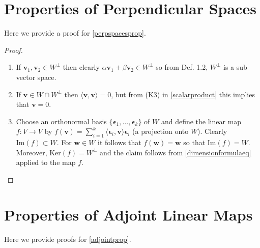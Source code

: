 \documentclass[a4paper,12pt]{report}
\begin{document}
\begin{appendices}
\section{Properties of Perpendicular Spaces} \label{perpspacespropapp} 

Here we provide a proof for \cref{perpspacesprop}.

\begin{proof}
    \begin{enumerate}[label=(\(L\)\arabic*)]
        \item If \(\mathbf{v}_1, \mathbf{v}_2 \in W^\perp\) then clearly \(\alpha \mathbf{v}_1 + \beta \mathbf{v}_2 \in W^\perp\) so from Def. 1.2, \(W^\perp\) is a sub vector space.
        \item If \(\mathbf{v} \in W \cap W^\perp\) then \(\langle \mathbf{v}, \mathbf{v} \rangle = 0\), but from (K3) in \cref{scalarproduct}  this implies that \(\mathbf{v} = 0\).
        \item Choose an orthonormal basis \(\{\bm{\epsilon}_1, \ldots, \bm{\epsilon}_k\}\) of \(W\) and define the linear map \(f : V \to V\) by \(f(\mathbf{v}) = \sum_{i=1}^{k} \langle \bm{\epsilon}_i, \mathbf{v} \rangle \bm{\epsilon}_i\) (a projection onto \(W\)). Clearly \(\text{Im}(f) \subset W\). For \(\mathbf{w} \in W\) it follows that \(f(\mathbf{w}) = \mathbf{w}\) so that \(\text{Im}(f) = W\). Moreover, \(\text{Ker}(f) = W^\perp\) and the claim follows from \cref{dimensionformulaeq}  applied to the map \(f\).
    \end{enumerate}
\end{proof}

\section{Properties of Adjoint Linear Maps} \label{adjointpropapp}

Here we provide proofs for \cref{adjointprop}.


\end{appendices}
\end{document}
